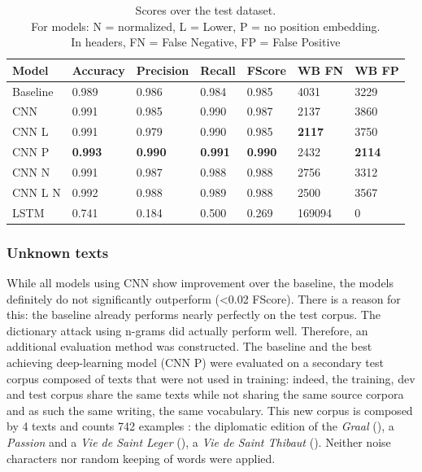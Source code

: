\documentclass{jdmdh}
\begin{document}
\begin{table}[!ht]
\centering
\begin{tabular}{lllllll}
\hline
Model    & Accuracy & Precision & Recall & FScore & WB FN & WB FP \\ \hline
Baseline & 0.989    & 0.986     & 0.984  & 0.985 & 4031 & 3229 \\
CNN      & 0.991    & 0.985     & 0.990  & 0.987 & 2137 & 3860 \\
CNN L    & 0.991    & 0.979     & 0.990  & 0.985 & \textbf{2117} & 3750 \\
CNN P    & \textbf{0.993}    & \textbf{0.990}& \textbf{0.991}  & \textbf{0.990} & 2432 & \textbf{2114} \\
CNN N    & 0.991    & 0.987     & 0.988  & 0.988 & 2756 & 3312 \\
CNN L N  & 0.992    & 0.988     & 0.989  & 0.988 & 2500 & 3567 \\
LSTM     & 0.741    & 0.184     & 0.500  & 0.269 & 169094 & 0 \\ \hline
\end{tabular}
\caption{Scores over the test dataset. \\\hspace{\textwidth}For models: N = normalized, L = Lower, P = no position embedding. \\\hspace{\textwidth}In headers, FN = False Negative, FP = False Positive}
\label{tab:scores}
\end{table}

\subsubsection{Unknown texts}

While all models using CNN show improvement over the baseline, the models definitely do not significantly outperform (\textless 0.02 FScore). There is a reason for this: the baseline already performs nearly perfectly on the test corpus. The dictionary attack using n-grams did actually perform well. Therefore, an additional evaluation method was constructed. The baseline and the best achieving deep-learning model (CNN P) were evaluated on a secondary test corpus composed of texts that were not used in training: indeed, the training, dev and test corpus share the same texts while not sharing the same source corpora and as such the same writing, the same vocabulary. This new corpus is composed by 4 texts and counts 742 examples : the diplomatic edition of the \textit{Graal} (\citet{graal}), a \textit{Passion} and a \textit{Vie de Saint Leger}  (\citet{old_french_corpus}), a \textit{Vie de Saint Thibaut} (\citet{theobaldus}). Neither noise characters nor random keeping of words were applied.
\end{document}
